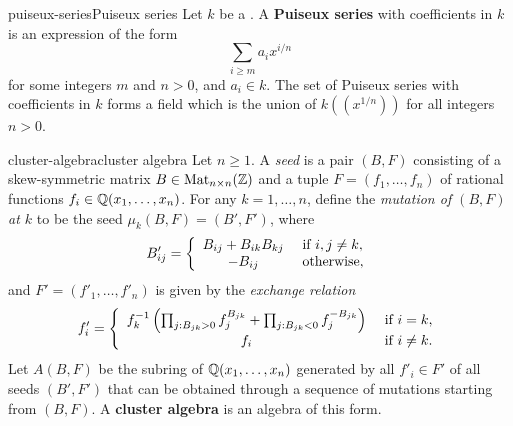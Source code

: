 \begin{topic}{puiseux-series}{Puiseux series}
    Let $k$ be a . A \textbf{Puiseux series} with coefficients in $k$ is an expression of the form
    \[ \sum_{i \ge m} a_i x^{i/n} \]
    for some integers $m$ and $n > 0$, and $a_i \in k$. The set of Puiseux series with coefficients in $k$ forms a field which is the union of $k(\!(x^{1/n})\!)$ for all integers $n > 0$.
\end{topic}

\begin{topic}{cluster-algebra}{cluster algebra}
    Let $n \ge 1$. A \textit{seed} is a pair $(B, F)$ consisting of a skew-symmetric matrix $B \in \operatorname{Mat}_{n \times n}(\mathbb{Z})$ and a tuple $F = (f_1, \ldots, f_n)$ of rational functions $f_i \in \mathbb{Q}(x_1, \ldots, x_n)$. For any $k = 1, \ldots, n$, define the \textit{mutation of $(B, F)$ at $k$} to be the seed $\mu_k(B, F) = (B', F')$, where
    \[ B'_{ij} = \left\{ \begin{array}{cl} B_{ij} + B_{ik} B_{kj} & \textup{ if } i, j \ne k, \\ - B_{ij} & \textup{ otherwise} , \end{array} \right. \]
    and $F' = (f'_1, \ldots, f'_n)$ is given by the \textit{exchange relation}
    \[ f'_i = \left\{ \begin{array}{cl}
        f_k^{-1} \left(\prod_{j : B_{jk} > 0} f_j^{B_{jk}} + \prod_{j : B_{jk} < 0} f_j^{-B_{jk}}\right) & \textup{ if } i = k , \\
        f_i & \textup{ if } i \ne k .
    \end{array} \right. \]
    Let $A(B, F)$ be the subring of $\mathbb{Q}(x_1, \ldots, x_n)$ generated by all $f'_i \in F'$ of all seeds $(B', F')$ that can be obtained through a sequence of mutations starting from $(B, F)$. A \textbf{cluster algebra} is an algebra of this form.
\end{topic}

